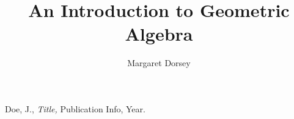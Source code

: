 \documentclass[11pt]{article} %
\title{An Introduction to Geometric Algebra}
\author{Margaret Dorsey}
\begin{document}
\maketitle




\begin{thebibliography}{9}



         {\sc Doe, J.,}
         {\em Title,}
         Publication Info, Year.


\end{thebibliography}
\end{document}
